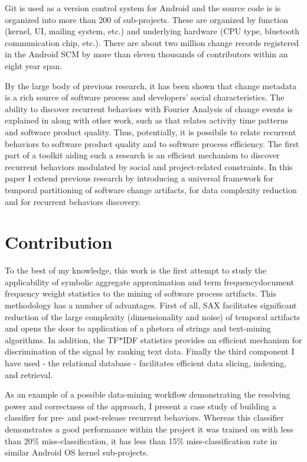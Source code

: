 \documentclass[10pt, conference, compsocconf]{IEEEtran}
\begin{document}
Git is used as a version control system for Android and the source code is is organized 
into more than 200 of sub-projects. These are organized by function 
(kernel, UI, mailing system, etc.) and underlying hardware 
(CPU type, bluetooth communication chip, etc.). 
There are about two million change records registered in the Android SCM by more than 
eleven thousands of contributors within an eight year span.

By the large body of previous research, it has been shown that change metadata is a rich 
source of software process and developers' social characteristics. The ability to discover
recurrent behaviors with Fourier Analysis of change events is 
explained in \cite{citeulike:10377345} along with other work, such as \cite{citeulike:10392277}
that relates activity time patterns and software product quality. Thus, potentially,
it is possibile to relate recurrent behaviors to software product 
quality and to software process efficiency. The first part of a toolkit
aiding such a research is an efficient mechanism to discover recurrent behaviors
modulated by social and project-related constraints. In this paper I extend 
previous research by introducing a universal framework for temporal 
partitioning of software change artifacts, for data complexity reduction 
and for recurrent behaviors discovery.

\section{Contribution}
To the best of my knowledge, this work is the first attempt to study the applicability
of symbolic aggregate approximation and term frequency\textendash document frequency
weight statistics to the mining of software process artifacts. 
This methodology has a number of advantages. First of all, SAX facilitates significant 
reduction of the large complexity (dimensionality and noise) of temporal artifacts 
and opens the door to application of a phetora of strings and text-mining algorithms.
In addition, the TF$\ast$IDF statistics provides an efficient mechanism for 
discrimination of the signal by ranking text data. Finally the third component I have 
used - the relational database - facilitates efficient data slicing, indexing,
and retrieval.

As an example of a possible data-mining workflow demonstrating the resolving power 
and correctness of the approach, I present a case study of building a classifier
for pre- and post-release recurrent behaviors. 
Whereas this classifier demonstrates a good performance within the project it was 
trained on with less than 20\% miss-classification, it has less than 15\% 
miss-classification rate in similar Android OS kernel sub-projects.
\end{document}
